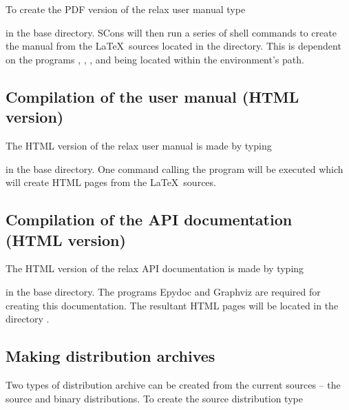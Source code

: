 To create the PDF version of the relax user manual type


in the base directory.
SCons will then run a series of shell commands to create the manual from the \LaTeX\ sources located in the  directory.
This is dependent on the programs , , , and  being located within the environment's path.



\subsection{Compilation of the user manual (HTML version)}

The HTML version of the relax user manual is made by typing


in the base directory.
One command calling the program  will be executed which will create HTML pages from the \LaTeX\ sources.



\subsection{Compilation of the API documentation (HTML version)}

The HTML version of the relax API documentation is made by typing


in the base directory.
The programs Epydoc and Graphviz are required for creating this documentation.
The resultant HTML pages will be located in the directory .



\subsection{Making distribution archives}

Two types of distribution archive can be created from the current sources -- the source and binary distributions.
To create the source distribution type 

